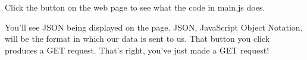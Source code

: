 Click the button on the web page to see what the code in main.js does.

    You’ll see JSON being displayed on the page. JSON, JavaScript Object Notation, will be the format in which our data is sent to us. That button you click produces a GET request. That’s right, you’ve just made a GET request!
